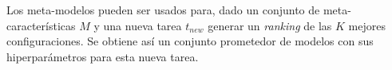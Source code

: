 
\quad


Los meta-modelos pueden ser usados para, dado un conjunto de meta-características $M$ y una nueva tarea $t_{new}$ generar un \textit{ranking} de las $K$ mejores configuraciones. Se obtiene así un conjunto prometedor de modelos con sus hiperparámetros para esta nueva tarea.
 
